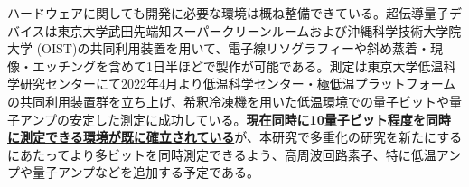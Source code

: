 \documentclass[11pt,a4j,dvipdfmx]{jarticle} 					%
\newcommand{\研究課題名}{誤り耐性量子コンピュータに向けた誤り訂正技術の開発(仮)}
\newcommand{\研究機関名}{東京大学}
\newcommand{\研究代表者氏名}{寺師弘二}
\newcommand{\研究期間の最終元号年度}{10}  %
\newcommand{\mybf}[1]{{\bfseries\sffamily#1}}
\begin{document}
ハードウェアに関しても開発に必要な環境は概ね整備できている。超伝導量子デバイスは東京大学武田先端知スーパークリーンルームおよび沖縄科学技術大学院大学 (OIST)の共同利用装置を用いて、電子線リソグラフィーや斜め蒸着・現像・エッチングを含めて1日半ほどで製作が可能である。測定は東京大学低温科学研究センターにて2022年4月より低温科学センター・極低温プラットフォームの共同利用装置群を立ち上げ、希釈冷凍機を用いた低温環境での量子ビットや量子アンプの安定した測定に成功している。\mybf{\ul{現在同時に10量子ビット程度を同時に測定できる環境が既に確立されている}}が、本研究で多重化の研究を新たにするにあたってより多ビットを同時測定できるよう、高周波回路素子、特に低温アンプや量子アンプなどを追加する予定である。

\end{document}
